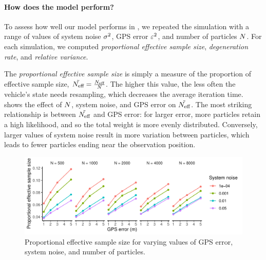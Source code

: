 \paragraph{How does the model perform?}





To assess how well our model performs in \rt{}, we repeated the simulation with a range of values of system noise $\sigma^2$, GPS error $\varepsilon^2$, and number of particles $N$. For each simulation, we computed \emph{proportional effective sample size}, \emph{degeneration rate}, and \emph{relative variance}.

The \emph{proportional effective sample size} is simply a measure of the proportion of effective sample size, $\tilde{N_\text{eff}} = \frac{N_\text{eff}}{N}$. The higher this value, the less often the vehicle's state needs resampling, which decreases the average iteration time.  shows the effect of $N$, system noise, and GPS error on $\tilde{N_\text{eff}}$. The most striking relationship is between $\tilde{N_\text{eff}}$ and GPS error: for larger error, more particles retain a high likelihood, and so the total weight is more evenly distributed. Conversely, larger values of system noise result in more variation between particles, which leads to fewer particles ending near the observation position.

\begin{knitrout}
\color{fgcolor}\begin{figure}

{\centering \includegraphics[width=\textwidth]{figure/model_performance_neff-1} 

}

\caption[Proportional effective sample size for varying values of GPS error, system noise, and number of particles]{Proportional effective sample size for varying values of GPS error, system noise, and number of particles.}\label{fig:model_performance_neff}
\end{figure}


\end{knitrout}


